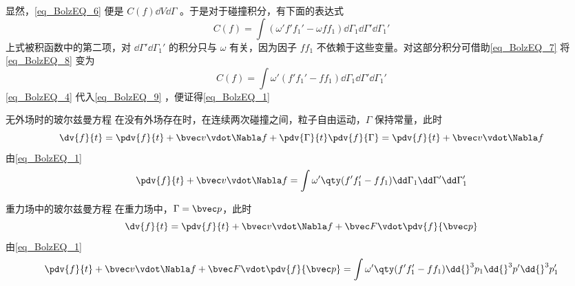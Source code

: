 显然，\autoref{eq_BolzEQ_6} 便是 $C(f)\dd V\dd\Gamma$ 。于是对于碰撞积分，有下面的表达式
\begin{equation}\label{eq_BolzEQ_8}
C(f)=\int(\omega'f'f_1'-\omega f f_1)\dd\Gamma_1\dd\Gamma'\dd\Gamma_1'
\end{equation}
上式被积函数中的第二项，对 $\dd\Gamma'\dd\Gamma_1'$ 的积分只与 $\omega$ 有关，因为因子 $ff_1$ 不依赖于这些变量。对这部分积分可借助\autoref{eq_BolzEQ_7} 将\autoref{eq_BolzEQ_8} 变为
\begin{equation}\label{eq_BolzEQ_9}
C(f)=\int\omega'(f'f_1'- f f_1)\dd\Gamma_1\dd\Gamma'\dd\Gamma_1'
\end{equation}
\autoref{eq_BolzEQ_4} 代入\autoref{eq_BolzEQ_9} ，便证得\autoref{eq_BolzEQ_1} 
\begin{example}{无外场时的玻尔兹曼方程}
在没有外场存在时，在连续两次碰撞之间，粒子自由运动，$\Gamma$ 保持常量，此时
\begin{equation}
\dv{f}{t}=\pdv{f}{t}+\bvec v\vdot \Nabla f+\pdv{\Gamma}{t}\pdv{f}{\Gamma}=\pdv{f}{t}+\bvec v\vdot \Nabla f
\end{equation}
由\autoref{eq_BolzEQ_1} 
\begin{equation}
\pdv{f}{t}+\bvec v\vdot \Nabla f=\int\omega'\qty(f'f_1'-ff_1)\dd\Gamma_1\dd\Gamma'\dd\Gamma_1'
\end{equation}
\end{example}
\begin{example}{重力场中的玻尔兹曼方程}
在重力场中，$\Gamma=\bvec p$，此时
\begin{equation}
\dv{f}{t}=\pdv{f}{t}+\bvec v\vdot \Nabla f+\bvec F\vdot\pdv{f}{\bvec p}
\end{equation}
由\autoref{eq_BolzEQ_1} 
\begin{equation}
\pdv{f}{t}+\bvec v\vdot \Nabla f+\bvec F\vdot\pdv{f}{\bvec p}=\int\omega'\qty(f'f_1'-ff_1)\dd{}^3  p_1\dd {}^3p'\dd{}^3 p_1'
\end{equation}
\end{example}